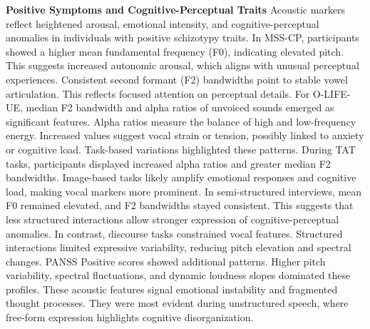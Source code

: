 \documentclass[9pt,a4paper]{rho-class/rho}
\begin{document}
\textbf{Positive Symptoms and Cognitive-Perceptual Traits}
Acoustic markers reflect heightened arousal, emotional intensity, and cognitive-perceptual anomalies in individuals with positive schizotypy traits. In MSS-CP, participants showed a higher mean fundamental frequency (F0), indicating elevated pitch. This suggests increased autonomic arousal, which aligns with unusual perceptual experiences. Consistent second formant (F2) bandwidths point to stable vowel articulation. This reflects focused attention on perceptual details.
For O-LIFE-UE, median F2 bandwidth and alpha ratios of unvoiced sounds emerged as significant features. Alpha ratios measure the balance of high and low-frequency energy. Increased values suggest vocal strain or tension, possibly linked to anxiety or cognitive load.
Task-based variations highlighted these patterns. During TAT tasks, participants displayed increased alpha ratios and greater median F2 bandwidths. Image-based tasks likely amplify emotional responses and cognitive load, making vocal markers more prominent. In semi-structured interviews, mean F0 remained elevated, and F2 bandwidths stayed consistent. This suggests that less structured interactions allow stronger expression of cognitive-perceptual anomalies.
In contrast, discourse tasks constrained vocal features. Structured interactions limited expressive variability, reducing pitch elevation and spectral changes.
PANSS Positive scores showed additional patterns. Higher pitch variability, spectral fluctuations, and dynamic loudness slopes dominated these profiles. These acoustic features signal emotional instability and fragmented thought processes. They were most evident during unstructured speech, where free-form expression highlights cognitive disorganization.
\end{document}
